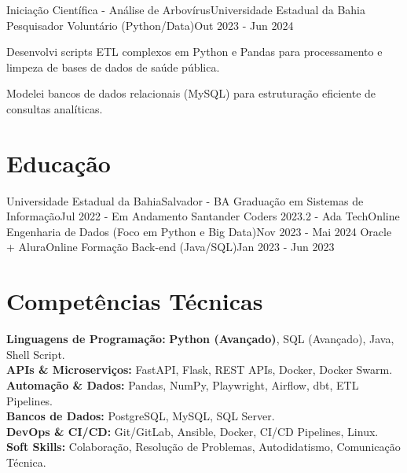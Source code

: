 \resumeSubheading
{Iniciação Científica - Análise de Arbovírus}{Universidade Estadual da Bahia}
{Pesquisador Voluntário (Python/Data)}{Out 2023 - Jun 2024}
\vspace{-2.0mm}
\resumeItemListStart
\item {Desenvolvi scripts ETL complexos em Python e Pandas para processamento e limpeza de bases de dados de saúde pública.}
\item {Modelei bancos de dados relacionais (MySQL) para estruturação eficiente de consultas analíticas.}
\resumeItemListEnd

\resumeSubHeadingListEnd
\vspace{-8.5mm}

\section{\textbf{Educação}}
\resumeSubHeadingListStart
\resumeSubheading
{Universidade Estadual da Bahia}{Salvador - BA}
{Graduação em Sistemas de Informação}{Jul 2022 - Em Andamento}
\resumeSubheading
{Santander Coders 2023.2 - Ada Tech}{Online}
{Engenharia de Dados (Foco em Python e Big Data)}{Nov 2023 - Mai 2024}
\resumeSubheading
{Oracle + Alura}{Online}
{Formação Back-end (Java/SQL)}{Jan 2023 - Jun 2023}
\resumeSubHeadingListEnd
\vspace{-5.5mm}

\section{\textbf{Competências Técnicas}}
\begin{itemize}[leftmargin=0.1in, label={}]
	\small{\item{
	      \textbf{Linguagens de Programação:}{ \textbf{Python (Avançado)}, SQL (Avançado), Java, Shell Script.} \\
	      \textbf{APIs \& Microserviços:}{ FastAPI, Flask, REST APIs, Docker, Docker Swarm.} \\
	      \textbf{Automação \& Dados:}{ Pandas, NumPy, Playwright, Airflow, dbt, ETL Pipelines.} \\
	      \textbf{Bancos de Dados:}{ PostgreSQL, MySQL, SQL Server.} \\
	      \textbf{DevOps \& CI/CD:}{ Git/GitLab, Ansible, Docker, CI/CD Pipelines, Linux.} \\
	      \textbf{Soft Skills:}{ Colaboração, Resolução de Problemas, Autodidatismo, Comunicação Técnica.} \\
	      }}
\end{itemize}
\vspace{-16pt}


